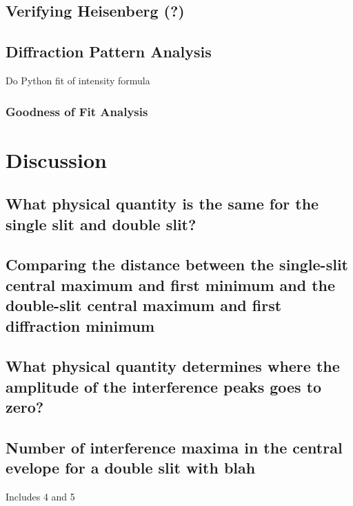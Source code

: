 \documentclass[12pt,twocolumn,letterpaper]{article}
\begin{document}
\subsection{Verifying Heisenberg (?)}
\subsection{Diffraction Pattern Analysis}
Do Python fit of intensity formula



\subsubsection{Goodness of Fit Analysis}




\section{Discussion}

\subsection{What physical quantity is the same for the single slit and double slit?}
\subsection{Comparing the distance between the single-slit central maximum and first minimum and the double-slit central maximum and first diffraction minimum}
\subsection{What physical quantity determines where the amplitude of the interference peaks goes to zero?}
\subsection{Number of interference maxima in the central evelope for a double slit with blah}
Includes 4 and 5
\end{document}
